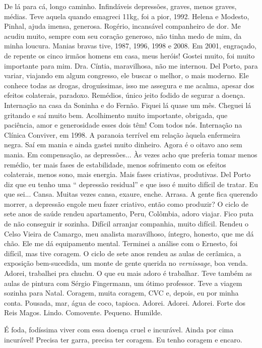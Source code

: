De lá para cá, longo caminho. Infindáveis depressões, graves, menos
graves, médias. Teve aquela quando emagreci 11kg, foi a pior, 1992.
Helena e Modesto, Pinhal, ajuda imensa, generosa. Rogério, incansável
companheiro de dor. Me acudiu muito, sempre com seu coração generoso,
não tinha medo de mim, da minha loucura. Manias bravas tive, 1987, 1996,
1998 e 2008. Em 2001, engraçado, de repente os cinco irmãos homens em
casa, meus heróis! Gostei muito, foi muito importante para mim. Dra.
Cíntia, maravilhosa, não me internou. Del Porto, para variar, viajando
em algum congresso, ele buscar o melhor, o mais moderno. Ele conhece
todas as drogas, droguíssimas, isso me assegura e me acalma, apesar dos
efeitos colaterais, paradoxo. Remédios, único jeito fodido de segurar a
doença. Internação na casa da Soninha e do Fernão. Fiquei lá quase um
mês. Cheguei lá gritando e saí muito bem. Acolhimento muito importante,
obrigada, que paciência, amor e generosidade esses dois têm! Com todos
nós. Internação na Clínica Conviver, em 1998. A paranoia terrível em
relação àquela enfermeira negra. Saí em mania e ainda gastei muito
dinheiro. Agora é o oitavo ano sem mania. Em compensação, as
depressões... Às vezes acho que preferia tomar menos remédio, ter mais
fases de estabilidade, menos sofrimento com os efeitos colaterais, menos
sono, mais energia. Mais fases criativas, produtivas. Del Porto diz que
eu tenho uma `` depressão residual'' e que isso é muito difícil de
tratar. Eu que sei... Cansa. Muitas vezes cansa, exaure, enche. Arrasa.
A gente fica querendo morrer, a depressão engole meu fazer criativo,
então como produzir? O ciclo de sete anos de saúde rendeu apartamento,
Peru, Colômbia, adoro viajar. Fico puta de não conseguir ir sozinha.
Difícil arranjar companhia, muito difícil. Rendeu o Celso Vieira de
Camargo, meu analista maravilhoso, íntegro, honesto, que me dá chão. Ele
me dá equipamento mental. Terminei a análise com o Ernesto, foi difícil,
mas tive coragem. O ciclo de sete anos rendeu as aulas de cerâmica, a
exposição bem-sucedida, um monte de gente querida no \emph{vernissage},
boa venda. Adorei, trabalhei pra chuchu. O que eu mais adoro é
trabalhar. Teve também as aulas de pintura com Sérgio Fingermann, um
ótimo professor. Teve a viagem sozinha para Natal. Coragem, muita
coragem, CVC e, depois, eu por minha conta. Pousada, mar, água de coco,
tapioca. Adorei. Adorei. Adorei. Forte dos Reis Magos. Lindo. Comovente.
Pequeno. Humilde.

É foda, fodíssima viver com essa doença cruel e incurável. Ainda por
cima incurável! Precisa ter garra, precisa ter coragem. Eu tenho coragem
e encaro.
